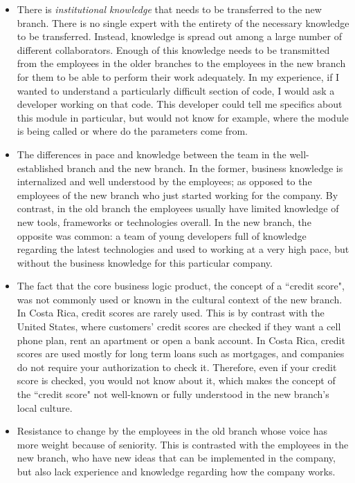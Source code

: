 \documentclass[12pt, letterpaper]{article}
\begin{document}
\begin{itemize}
  \item There is \textit{institutional knowledge} that needs to be transferred to the new branch. There is no single expert with  the entirety of the necessary knowledge to be transferred. Instead, knowledge is spread out among a 
  large number of different collaborators. Enough of this knowledge needs to be transmitted from the employees in the 
  older branches to the employees in the new 
  branch for them to be able to perform their work adequately. In my experience, if I wanted to understand a particularly difficult
  section of code, I would ask a developer working on that code. This developer could tell me specifics about this 
  module in particular, but would not know for example, where the module is being called or where do the parameters come
  from.
  \item The differences in pace and knowledge between the team in the well-established branch and the new branch.
  In the former, business knowledge is internalized and well understood by the employees; as opposed to the employees of the new
  branch who just started working for the company. 
 By contrast, in the old branch the employees usually have limited knowledge of new tools, 
  frameworks or technologies overall. In the new branch, the opposite was
  common: a team of young developers full of knowledge regarding the latest technologies and used to working at a 
  very high pace, but without the business knowledge for this particular company. 
  \item The fact that the core business logic product, the concept of a ``credit score", was not commonly used or known in the 
  cultural context of the new branch. In Costa Rica, credit scores are rarely used. This is by contrast with the 
  United States, where customers' credit scores are checked if they want a cell phone plan, rent an apartment or open a bank account.
  In Costa Rica, credit scores are used mostly for long term loans such as mortgages, and companies do not require your
  authorization to check it. Therefore, even if
  your credit score is checked, you would not know about it, which makes the concept of the ``credit score" not well-known or fully understood in the new branch's local culture.
  \item Resistance to change by the employees in the old branch whose voice has more weight
  because of seniority. This is contrasted with the employees in the new branch, who have new ideas 
  that can be implemented in the company, but also lack experience and knowledge regarding how the company works.

\end{itemize}
\end{document}
